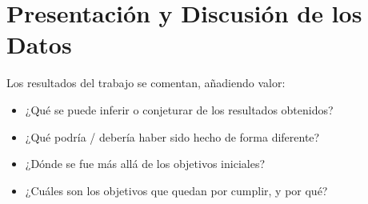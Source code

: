 \chapter{Presentación y Discusión de los Datos}\label{cap:discussion}

Los resultados del trabajo se comentan, añadiendo valor:

\begin{itemize}
\item ¿Qué se puede inferir o conjeturar de los resultados obtenidos?
\item ¿Qué podría / debería haber sido hecho de forma diferente?
\item ¿Dónde se fue más allá de los objetivos iniciales?
\item ¿Cuáles son los objetivos que quedan por cumplir, y por qué?
\end{itemize}